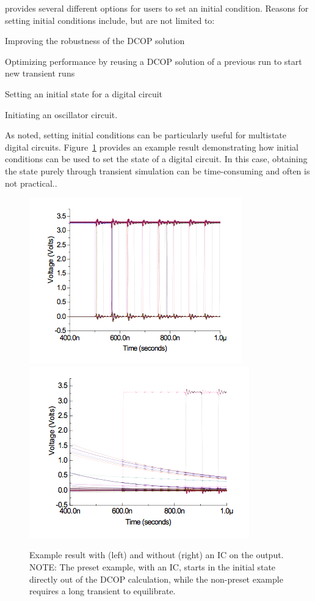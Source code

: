 \Xyce{} provides several different options for users to set an initial
condition. Reasons for setting initial conditions include, but are not
limited to:

\begin{XyceItemize}
\item Improving the robustness of the DCOP solution
\item Optimizing performance by reusing a DCOP solution of a previous run to start new transient runs
\item Setting an initial state for a digital circuit
\item Initiating an oscillator circuit.
\end{XyceItemize}

As noted, setting initial conditions can be particularly useful for multistate
digital circuits.  Figure~\ref{preset_vs_nopreset} provides an example result demonstrating how initial conditions can be used 
to set the state of a digital circuit.
In this case, obtaining the state purely through transient simulation can be time-consuming and often is not practical..  

\begin{figure}[ht]
  \centering
  \scalebox{0.5}
  { \includegraphics{preset} \includegraphics{nopreset} }
  \caption[Example result with and without an Initial Condition (IC).]
  {Example result with (left) and without (right) an IC on the output.  
NOTE:	The preset example, with an IC, starts in the initial state directly out of the DCOP calculation, while the non-preset example requires a long transient to equilibrate.  \label{preset_vs_nopreset}}
\end{figure}

